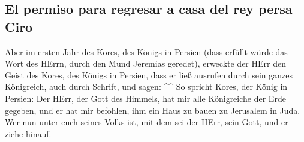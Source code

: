 \hypertarget{el-permiso-para-regresar-a-casa-del-rey-persa-ciro}{%
\subsection{El permiso para regresar a casa del rey persa
Ciro}\label{el-permiso-para-regresar-a-casa-del-rey-persa-ciro}}

 Aber im ersten Jahr des Kores, des Königs in Persien
(dass erfüllt würde das Wort des HErrn, durch den Mund Jeremias
geredet), erweckte der HErr den Geist des Kores, des Königs in Persien,
dass er ließ ausrufen durch sein ganzes Königreich, auch durch Schrift,
und sagen: \^{}\^{}  So spricht Kores, der König in
Persien: Der HErr, der Gott des Himmels, hat mir alle Königreiche der
Erde gegeben, und er hat mir befohlen, ihm ein Haus zu bauen zu
Jerusalem in Juda. Wer nun unter euch seines Volks ist, mit dem sei der
HErr, sein Gott, und er ziehe hinauf.
